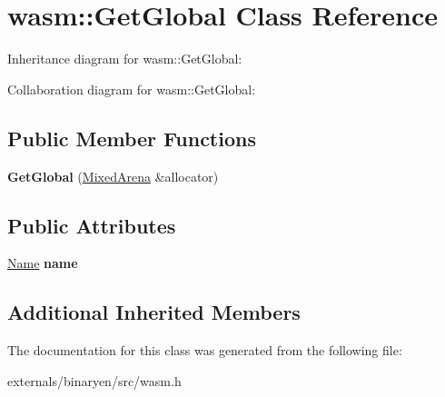 \hypertarget{classwasm_1_1_get_global}{}\section{wasm\+:\+:Get\+Global Class Reference}
\label{classwasm_1_1_get_global}


Inheritance diagram for wasm\+:\+:Get\+Global\+:


Collaboration diagram for wasm\+:\+:Get\+Global\+:
\subsection*{Public Member Functions}
\begin{DoxyCompactItemize}
\item 
\mbox{\label{classwasm_1_1_get_global_ac86523f35c75e4694714e95e4749eb4f}} 
{\bfseries Get\+Global} (\mbox{\hyperlink{struct_mixed_arena}{Mixed\+Arena}} \&allocator)
\end{DoxyCompactItemize}
\subsection*{Public Attributes}
\begin{DoxyCompactItemize}
\item 
\mbox{\label{classwasm_1_1_get_global_a079c220c8d90b5556047f3468881c41c}} 
\mbox{\hyperlink{structwasm_1_1_name}{Name}} {\bfseries name}
\end{DoxyCompactItemize}
\subsection*{Additional Inherited Members}


The documentation for this class was generated from the following file\+:\begin{DoxyCompactItemize}
\item 
externals/binaryen/src/wasm.\+h\end{DoxyCompactItemize}
